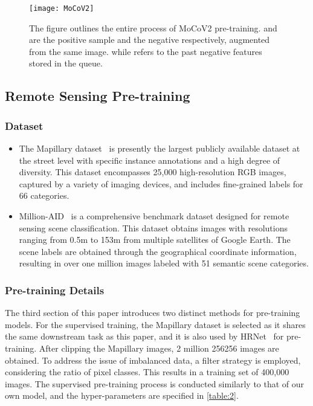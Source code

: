 \documentclass[journal]{IEEEtran}
\begin{document}
\begin{figure*}[t]
    \centering
    \texttt{[image: MoCoV2]}
    \caption{The figure outlines the entire process of MoCoV2 pre-training.  and  are the positive sample and the negative respectively, augmented from the same image.  while  refers to the past negative features stored in the queue.}
    \label{fig:moco}
\end{figure*}


\subsection{Remote Sensing Pre-training}
\subsubsection{Dataset}
\begin{itemize}
\item[] The Mapillary dataset~\cite{neuhold2017mapillary} is presently the largest publicly available dataset at the street level with specific instance annotations and a high degree of diversity. This dataset encompasses 25,000 high-resolution RGB images, captured by a variety of imaging devices, and includes fine-grained labels for 66 categories.
\end{itemize}

\begin{itemize}
\item[] Million-AID~\cite{long2021creating} is a comprehensive benchmark dataset designed for remote sensing scene classification. This dataset obtains images with resolutions ranging from 0.5m to 153m from multiple satellites of Google Earth. The scene labels are obtained through the geographical coordinate information, resulting in over one million images labeled with 51 semantic scene categories.
\end{itemize}


\subsubsection{Pre-training Details}
 The third section of this paper introduces two distinct methods for pre-training models. For the supervised training, the Mapillary dataset is selected as it shares the same downstream task as this paper, and it is also used by HRNet~\cite{zhang2019multi} for pre-training. After clipping the Mapillary images, 2 million 256256 images are obtained. To address the issue of imbalanced data, a filter strategy is employed, considering the ratio of pixel classes. This results in a training set of 400,000 images. The supervised pre-training process is conducted similarly to that of our own model, and the hyper-parameters are specified in \ref{table:2}.
\end{document}
